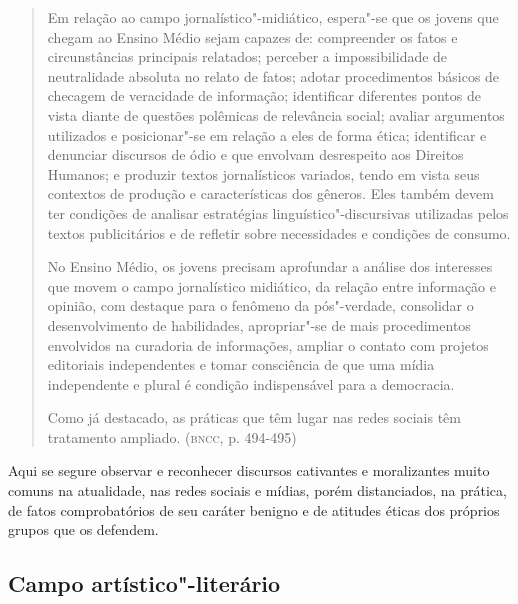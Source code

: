 \documentclass[11pt]{extarticle}
\begin{document}
\begin{quote}
Em relação ao campo jornalístico"-midiático, espera"-se que os jovens
que chegam ao Ensino Médio sejam capazes de: compreender os fatos e
circunstâncias principais relatados; perceber a impossibilidade de
neutralidade absoluta no relato de fatos; adotar procedimentos básicos
de checagem de veracidade de informação; identificar diferentes pontos
de vista diante de questões polêmicas de relevância social; avaliar
argumentos utilizados e posicionar"-se em relação a eles de forma ética;
identificar e denunciar discursos de ódio e que envolvam desrespeito aos
Direitos Humanos; e produzir textos jornalísticos variados, tendo em
vista seus contextos de produção e características dos gêneros. Eles
também devem ter condições de analisar estratégias
linguístico"-discursivas utilizadas pelos textos publicitários e de
refletir sobre necessidades e condições de consumo.

No Ensino Médio, os jovens precisam aprofundar a análise dos interesses
que movem o campo jornalístico midiático, da relação entre informação e
opinião, com destaque para o fenômeno da pós"-verdade, consolidar o
desenvolvimento de habilidades, apropriar"-se de mais procedimentos
envolvidos na curadoria de informações, ampliar o contato com projetos
editoriais independentes e tomar consciência de que uma mídia
independente e plural é condição indispensável para a democracia.

Como já destacado, as práticas que têm lugar nas redes sociais têm
tratamento ampliado. (\textsc{bncc}, p. 494-495)
\end{quote}

Aqui se segure observar e reconhecer discursos cativantes e
moralizantes muito comuns na atualidade, nas redes sociais e mídias,
porém distanciados, na prática, de fatos comprobatórios de seu caráter
benigno e de atitudes éticas dos próprios grupos que os defendem.

\subsection{Campo artístico"-literário}
\end{document}
